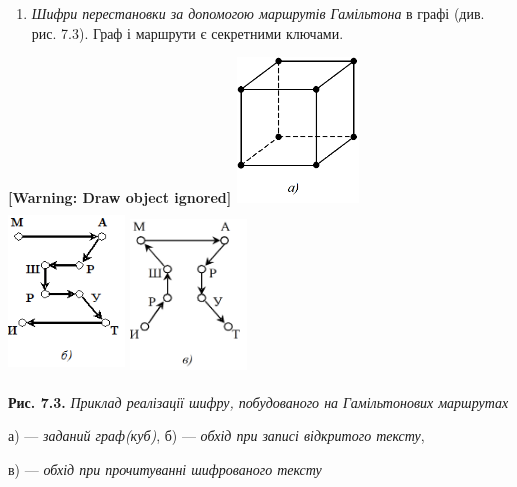 \liststyleWWviiiNumxli
\setcounter{saveenum}{\value{enumi}}
\begin{enumerate}
\setcounter{enumi}{\value{saveenum}}
\item \textit{Шифри перестановки за допомогою маршрутів Гамільтона} в графі
(див. рис. 7.3). Граф і маршрути є секретними ключами.
\end{enumerate}

\bigskip

{\centering\bfseries
[Warning: Draw object ignored]
\includegraphics[width=1.2811in,height=1.5209in]{crypt-img/crypt-img69.png}
\ \ \ \ 
\includegraphics[width=1.2189in,height=1.7335in]{crypt-img/crypt-img70.png} 
\includegraphics[width=1.2189in,height=1.6665in]{crypt-img/crypt-img71.png} 
\par}


\bigskip

{\centering
\textbf{Рис. 7.3. }\textit{Приклад реалізації шифру, побудованого на
Гамільтонових маршрутах}
\par}

{\centering
а) --- \textit{заданий граф(куб)}, б) --- \textit{обхід при записі відкритого
тексту}, 
\par}

{\centering
в) --- \textit{обхід при прочитуванні шифрованого тексту}
\par}

